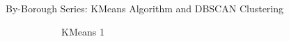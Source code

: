 \documentclass[12pt]{beamer}
\begin{document}
        \begin{frame}{By-Borough Series: KMeans Algorithm and DBSCAN Clustering}
            \begin{figure}
                \centering
                \begin{subfigure}{0.20\textwidth}
                    \caption{KMeans 1}
                \end{subfigure}
                \begin{subfigure}{0.20\textwidth}
\end{subfigure}
\end{figure}
\end{frame}
\end{document}
